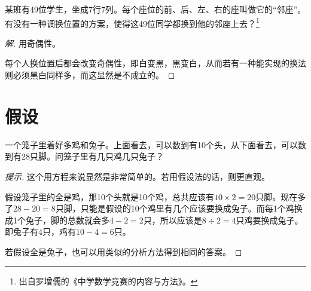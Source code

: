 \begin{example}
  某班有49位学生，坐成7行7列。每个座位的前、后、左、右的座叫做它的“邻座”。有没有一种调换位置的方案，使得这49位同学都换到他的邻座上去？\footnote{出自罗增儒的《中学数学竞赛的内容与方法》。}
\end{example}
\begin{proof}[解]用奇偶性。
    \begin{center}
  \end{center}
  每个人换位置后都会改变奇偶性，即白变黑，黑变白，从而若有一种能实现的换法则必须黑白同样多，而这显然是不成立的。
\end{proof}

\section{假设}
\label{sec:assumption}

\begin{example}[鸡兔同笼]
  一个笼子里着好多鸡和兔子。上面看去，可以数到有10个头，从下面看去，可以数到有28只脚。问笼子里有几只鸡几只兔子？
\end{example}
\begin{proof}[提示]
  这个用方程来说显然是非常简单的。若用假设法的话，则更直观。

  假设笼子里的全是鸡，那10个头就是10个鸡，总共应该有$10\times2=20$只脚。现在多了$28-20=8$只脚，只能是假设的10个鸡里有几个应该要换成兔子。而每1个鸡换成1个兔子，脚的总数就会多$4-2=2$只，所以应该是$8\div 2=4$只鸡要换成兔子。即兔子有$4$只，鸡有$10-4=6$只。

  若假设全是兔子，也可以用类似的分析方法得到相同的答案。
\end{proof}